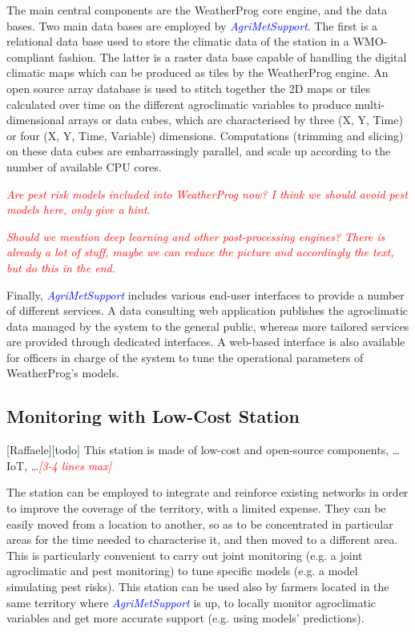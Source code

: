 \documentclass[authoryear,preprint,review,12pt]{elsarticle}
\newcommand{\note}[1]{\emph{\textcolor{red}{#1}}}
\newcommand{\update}[1]{\emph{\textcolor{blue}{#1}}}
\newcommand{\gci}{\update{AgriMetSupport}\xspace}
\begin{document}
The main central components are the WeatherProg core engine, and the data bases. Two main data bases are employed by \gci.
The first is a relational data base used to store the climatic data of the station in a WMO-compliant fashion.
The latter  is a raster data base capable of handling the digital climatic maps which can be produced as tiles by the WeatherProg engine.
An open source array database is used to stitch together the 2D maps or tiles calculated over time on the different agroclimatic variables to produce multi-dimensional arrays or data cubes, which are  characterised by three (X, Y, Time) or four (X, Y, Time, Variable) dimensions.
Computations (trimming and slicing) on these data cubes are embarrassingly parallel, and scale up according to the number of available CPU cores.

\note{Are pest risk models included into WeatherProg now? I think we should avoid pest models here, only give a hint.}

\note{Should we mention deep learning and other post-processing engines? There is already a lot of stuff, maybe we can reduce the picture and accordingly the text, but do this in the end.}

Finally, \gci includes various end-user interfaces to provide a number of different services. A data consulting web application publishes the agroclimatic data managed by the system to the general public, whereas more tailored services are provided through dedicated interfaces. A web-based interface is also available for officers in charge of the system to tune the operational parameters of WeatherProg's models.

\subsection{Monitoring with Low-Cost Station}[Raffaele][todo]
This station is made of low-cost and open-source components, \ldots IoT, \dots \note{[3-4 lines max]}

The station can be employed to integrate and reinforce existing networks in order to improve the coverage of the territory, with a limited expense.
They can be easily moved from a location to another, so as to be concentrated in particular areas for the time needed to characterise it, and then moved to a different area.
This is particularly convenient to carry out joint monitoring (e.g. a  joint agroclimatic and pest monitoring) to tune specific models (e.g. a model simulating pest risks).
This station can be used also by farmers located in the same territory where \gci is up, to locally monitor agroclimatic variables and get more accurate support (e.g. using models' predictions).
\end{document}
